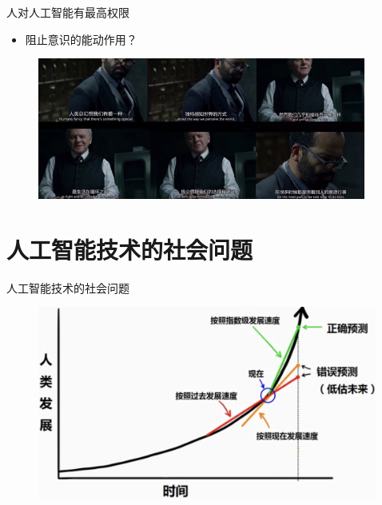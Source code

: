 \documentclass{beamer}
\begin{document}
 \begin{frame}{人对人工智能有最高权限}
    \begin{itemize}
     \item  阻止意识的能动作用？
    \end{itemize}

   \begin{figure}[H]
   \centering
   \includegraphics[width=4.25in]{gtyPic3.jpg}
   \end{figure}

  \end{frame}

\section{人工智能技术的社会问题}
  \begin{frame}{人工智能技术的社会问题}
   \begin{figure}[H]
   \centering
   \includegraphics[height=2.5in]{zsjPic1.jpg}
   \end{figure}
  \end{frame} 
\end{document}
